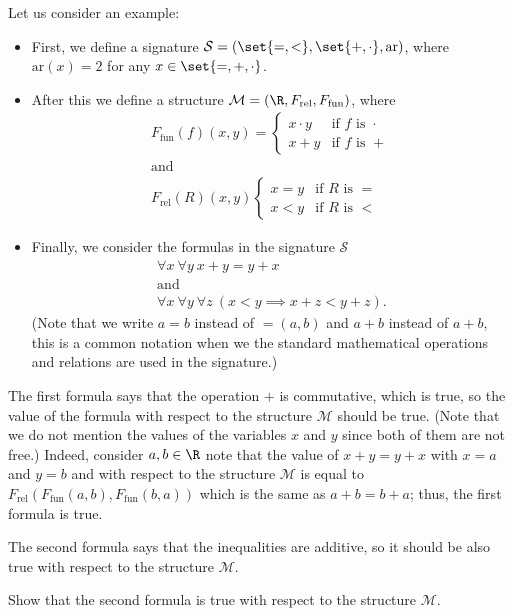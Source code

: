 Let us consider an example:
\begin{itemize}
  \item First, we define a signature
    $\mathcal{S} = (\set{=, <}, \set{+, \cdot}, \mathrm{ar})$, where
    $\mathrm{ar}(x) = 2$ for any $x \in \set{=, +, \cdot}$.
  \item After this we define a structure $\mathcal{M} = (\R, F_\mathrm{rel},
    F_\mathrm{fun})$, where
    \begin{gather*}
      F_\mathrm{fun}(f)(x, y) = \begin{cases}
        x \cdot y & \text{if } f \text{ is } \cdot \\
        x + y & \text{if } f \text{ is } +
      \end{cases} \\
      \text{and} \\
      F_\mathrm{rel}(R)(x, y) \begin{cases}
        x = y & \text{if } R \text{ is } = \\
        x < y & \text{if } R \text{ is } <
      \end{cases}
    \end{gather*}
  \item Finally, we consider the formulas in the signature $\mathcal{S}$
    \begin{gather*}
      \forall x \ \forall y \ x + y = y + x \\
      \text{and} \\
      \forall x \ \forall y \ \forall z \ (x < y \implies x + z < y + z).
    \end{gather*}
    (Note that we write $a = b$ instead of $=(a, b)$ and $a + b$ instead of
    $a + b$, this is a common notation when we the standard mathematical
    operations and relations are used in the signature.)
\end{itemize}
The first formula says that the operation $+$ is commutative, which is true, so
the value of the formula with respect to the structure $\mathcal{M}$ should be
true. (Note that we do not mention the values of the variables $x$ and $y$
since both of them are not free.) Indeed, consider $a, b \in \R$ note that the
value of $x + y = y + x$ with $x = a$ and $y = b$ and with respect to the
structure $\mathcal{M}$ is equal to $F_\mathrm{rel}(F_\mathrm{fun}(a, b),
F_\mathrm{fun}(b, a))$ which is the same as $a + b = b + a$; thus, the first
formula is true.

The second formula says that the inequalities are additive, so it should be also
true with respect to the structure $\mathcal{M}$.
\begin{exercise}
  Show that the second formula is true with respect to the structure
  $\mathcal{M}$.
\end{exercise}

